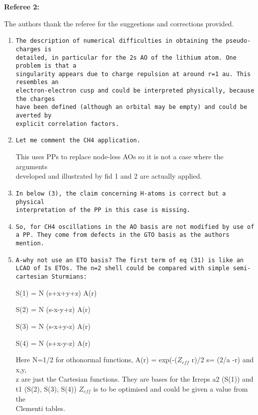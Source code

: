 \documentclass[10pt]{article}
\begin{document}
\noindent
{\bf Referee 2:}

\vspace{0.2cm}
The authors thank the referee for the suggestions and corrections provided.

\begin{enumerate}
 \item {\tt The description of numerical difficulties in obtaining 
 the pseudo-charges is \\ detailed, in particular for the 2s AO of the 
 lithium atom. One problem is that a \\ singularity appears due to charge 
 repulsion at around r=1 au. This resembles an \\ electron-electron cusp 
 and could be interpreted physically, because the charges \\ have been 
 defined (although an orbital may be empty) and could be averted by 
 \\ explicit correlation factors.}
 
 \item {\tt Let me comment the CH4 application.
 
 This uses PPs to replace node-less AOs so it is not a case
 where the arguments \\ developed and illustrated by fid 1 and 2 are
 actually applied.}
 
 \item {\tt In below (3), the claim concerning H-atoms is correct but 
 a physical \\ interpretation of the PP in this case is missing.}
 
 \item {\tt So, for CH4 oscillations in the AO basis are not modified
 by use of a PP. They come from defects in the GTO basis as the authors
 mention. }
 
 \item {\tt A-why not use an ETO basis? The first term of eq (31) is 
 like an LCAO of Is ETOs.
The n=2 shell could be compared with simple semi-cartesian Sturmians:

S(1) = N (s+x+y+z) A(r) 

S(2) = N (s-x-y+z) A(r) 

S(3) = N (s-x+y-z) A(r) 

S(4) = N (s+x-y-z) A(r) 

Here N=1/2 for othonormal functions,  A(r) = exp(-($Z_{eff}$ r)/2 
s= (2/a -r) and x,y,\\z are just the Cartesian functions.
They are bases for the Irreps a2 (S(1)) and \\ t1 (S(2), S(3), S(4)) 
$Z_{eff}$ is to be optimised and could be given a value from the \\
Clementi  tables.}
 

\end{enumerate}
\end{document}
